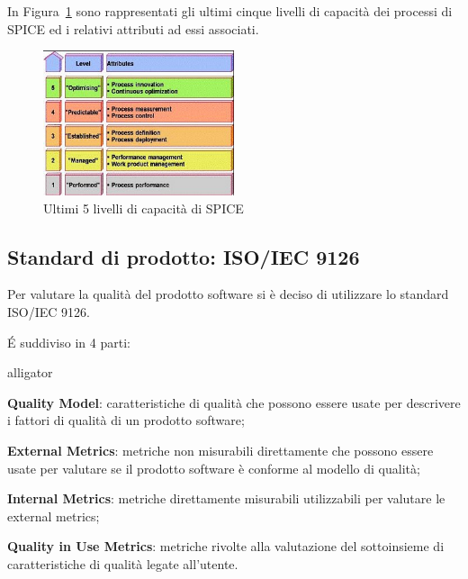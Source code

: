 In Figura~\ref{fig:liv_cap_spice} sono rappresentati gli ultimi cinque livelli di capacità dei processi di SPICE ed i relativi attributi ad essi associati.

\begin{figure}[h!]
	\centering
	\includegraphics[width=0.50\textwidth]{img/liv_cap_spice.jpg}
	\caption{Ultimi 5 livelli di capacità di SPICE}
	\label{fig:liv_cap_spice}
\end{figure}


\subsection{Standard di prodotto: ISO/IEC 9126}
\label{AppA:standardProd}
Per valutare la qualità del prodotto software si è deciso di utilizzare lo standard ISO/IEC 9126.


É suddiviso in 4 parti:
\begin{labeling}{alligator}
	\item \textbf{Quality Model}: caratteristiche di qualità che possono essere usate per descrivere i fattori di qualità di un prodotto software;
	
	\item \textbf{External Metrics}: metriche non misurabili direttamente che possono essere usate per valutare se il prodotto software è conforme al modello di qualità;
	
	\item \textbf{Internal Metrics}: metriche direttamente misurabili utilizzabili per valutare le external metrics;
	
	\item \textbf{Quality in Use Metrics}: metriche rivolte alla valutazione del sottoinsieme di caratteristiche di qualità legate all’utente.
\end{labeling}

